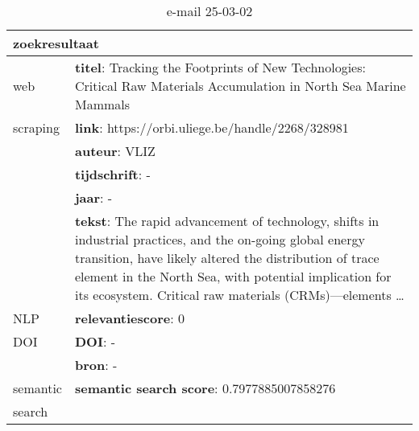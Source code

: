 \begin{table}[h!]
    \caption{e-mail 25-03-02}
    \centering
    \begin{tabularx}{\textwidth}{|p{4cm}|X|} 
        \hline
        \multicolumn{2}{|X|}{\textbf{zoekresultaat}} \\
        \hline
        web &\textbf{titel}: Tracking the Footprints of New Technologies: Critical Raw Materials Accumulation in North Sea Marine Mammals\\
        scraping&\textbf{link}: https://orbi.uliege.be/handle/2268/328981\\
        &\textbf{auteur}: VLIZ\\
        &\textbf{tijdschrift}: -\\
        &\textbf{jaar}: -\\
        &\textbf{tekst}: The rapid advancement of technology, shifts in industrial practices, and the on-going global energy transition, have likely altered the distribution of trace element in the North Sea, with potential implication for its ecosystem. Critical raw materials (CRMs)—elements …\\
        \hline
        NLP&\textbf{relevantiescore}: 0\\
        \hline
        DOI&\textbf{DOI}: -\\
        &\textbf{bron}: -\\
        \hline
        semantic&\textbf{semantic search score}: 0.7977885007858276\\
        search&\\
        \hline
    \end{tabularx}
    \label{table:email20250302}
\end{table}
